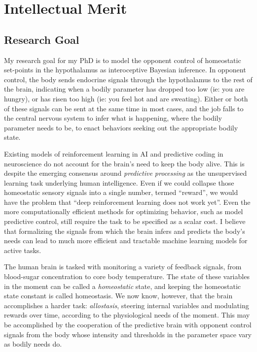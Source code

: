 \section*{Intellectual Merit}

\subsection*{Research Goal}
\begin{singlespace}
My research goal for my PhD is to model the opponent control of homeostatic
set-points in the hypothalamus as interoceptive Bayesian inference. In opponent
control, the body sends endocrine signals through the hypothalamus to the rest of
the brain, indicating when a bodily parameter has dropped too low (ie: you are
hungry), or has risen too high (ie: you feel hot and are sweating).  Either or
both of these signals can be sent at the same time in most cases, and the job
falls to the central nervous system to infer what is happening, where the
bodily parameter needs to be, to enact behaviors seeking out the appropriate
bodily state.

Existing models of reinforcement learning in AI and predictive coding in
neuroscience do not account for the brain's need to keep the body alive.
This is despite the emerging consensus around
\emph{predictive processing} as the unsupervised learning task underlying
human intelligence.  Even if we could collapse those homeostatic sensory
signals into a single number, termed ``reward'', we would have the problem
that ``deep reinforcement learning does not work yet''\cite{rlblogpost}.  Even
the more computationally efficient methods for optimizing behavior, such as model
predictive control, still require the task to be specified as a scalar
cost\cite{6386025}.  I believe that formalizing the signals from which the brain infers
and predicts the body's needs can lead to much more efficient and tractable machine
learning models for active tasks.
\end{singlespace}

\begin{singlespace}
The human brain is tasked with monitoring a variety of feedback signals, from
blood-sugar concentration to core body temperature.  The state of these
variables in the moment can be called a \emph{homeostatic} state, and
keeping the homeostatic state constant is called homeostasis.  We now know,
however, that the brain accomplishes a harder task: \emph{allostasis}, steering
internal variables and modulating rewards over time, according to the physiological
needs of the moment\cite{Sterling2012,Kleckner2017}.  This may be accomplished by the cooperation
of the predictive brain with opponent control signals from the body whose
intensity and thresholds in the parameter space vary as bodily needs do\cite{Morville2018a}.
\end{singlespace}